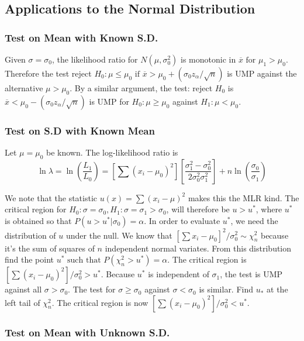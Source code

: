 \documentclass{article}
\begin{document}
\subsection{Applications to the Normal Distribution}

\subsubsection{Test on Mean with Known S.D.}

Given \(\sigma=\sigma_0\), the likelihood ratio for \(N(\mu,\sigma_0^2)\) is monotonic in \(\overline{x} \text{ for } \mu_1 > \mu_0\). Therefore the test reject \(H_0: \mu \leq \mu_0 \text{ if } \overline{x}>\mu_0+(\sigma_0 z_\alpha/\sqrt{n})\) is UMP against the alternative \(\mu>\mu_0\). By a similar argument, the test: reject \(H_0\) is \(\overline{x}<\mu_0-(\sigma_0 z_\alpha/\sqrt{n})\) is UMP for \(H_0:\mu \geq \mu_0\) against \(H_1: \mu < \mu_0\).

\subsubsection{Test on S.D with Known Mean}

Let \(\mu=\mu_0\) be known. The log-likelihood ratio is
\begin{equation*}
    \ln \lambda=\ln \left(\frac{L_1}{L_0}\right)=\left[\sum(x_i-\mu_0)^2\right] \left[\frac{\sigma_1^2-\sigma_0^2}{2\sigma_0^2\sigma_1^2} \right] + n \ln \left(\frac{\sigma_0}{\sigma_1} \right)
\end{equation*}

We note that the statistic \(u(x)=\sum(x_i-\mu)^2\) makes this the MLR kind. The critical region for \(H_0:\sigma=\sigma_0, H_1:\sigma=\sigma_1>\sigma_0\), will therefore be \(u>u^*\), where \(u^*\) is obtained so that \(P(u>u^*|\sigma_0)=\alpha\). In order to evaluate \(u^*\), we need the distribution of \(u\) under the null. We know that \([\sum x_i-\mu_0]^2/\sigma_0^2 \sim \chi_n^2\) because it's the sum of squares of $n$ independent normal variates. From this distribution find the point \(u^* \text{ such that } P(\chi_n^2>u^*)=\alpha\). The critical region is \([\sum(x_i-\mu_0)^2]/\sigma_0^2>u^*\). Because $u^*$ is independent of \(\sigma_1\), the test is UMP against all \(\sigma>\sigma_0\). The test for \(\sigma \geq \sigma_0\) against \(\sigma < \sigma_0\) is similar. Find \(u_*\) at the left tail of \(\chi_n^2\). The critical region is now \([\sum(x_i-\mu_0)^2]/\sigma_0^2<u^*\).

\subsubsection{Test on Mean with Unknown S.D.}
\end{document}

